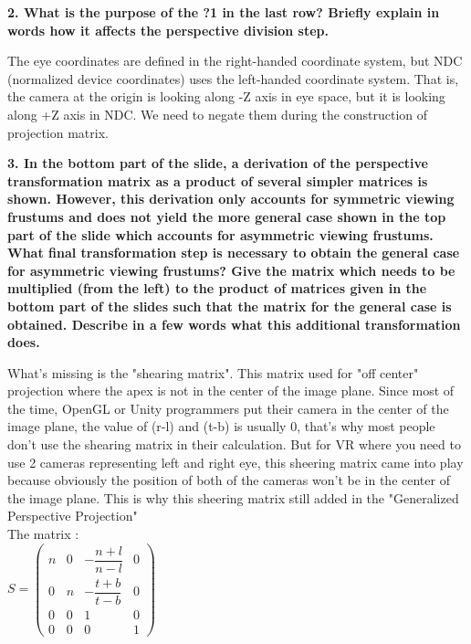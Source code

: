 \documentclass[10pt,a4paper]{article}
\begin{document}
\begin{flushleft}
{\bf 2. What is the purpose of the ?1 in the last row? Briefly explain in words how it affects the perspective division step. } \\
\end{flushleft}

The eye coordinates are defined in the right-handed coordinate system, but NDC (normalized device coordinates) uses the left-handed coordinate system. That is, the camera at the origin is looking along -Z axis in eye space, but it is looking along +Z axis in NDC. We need to negate them during the construction of projection matrix. \\

\begin{flushleft}
{\bf 3. In the bottom part of the slide, a derivation of the perspective transformation matrix as a product of several simpler matrices is shown. However, this derivation only accounts for symmetric viewing frustums and does not yield the more general case shown in the top part of the slide which accounts for asymmetric viewing frustums. What final transformation step is necessary to obtain the general case for asymmetric viewing frustums? Give the matrix which needs to be multiplied (from the left) to the product of matrices given in the bottom part of the slides such that the matrix for the general case is obtained. Describe in a few words what this additional transformation does. } \\
\end{flushleft}

What's missing is the "shearing matrix". This matrix used for "off center" projection where the apex is not in the center of the image plane. Since most of the time, OpenGL or Unity programmers put their camera in the center of the image plane, the value of (r-l) and (t-b) is usually 0, that's why most people don't use the shearing matrix in their calculation. But for VR where you need to use 2 cameras representing left and right eye, this sheering matrix came into play because obviously the position of both of the cameras won't be in the center of the image plane. This is why this sheering matrix still added in the "Generalized Perspective Projection" \\

The matrix : \\

\(
S =
  \begin{pmatrix}
    n & 0 & -\dfrac{n+l}{n-l} & 0 \\
    0 & n & -\dfrac{t+b}{t-b} & 0\\
    0 & 0 & 1 & 0 \\
    0 & 0 & 0 & 1
  \end{pmatrix}
\) \\ \\
\end{document}
